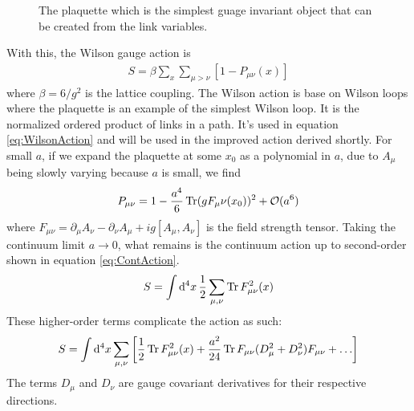 \documentclass[11pt]{article}
\begin{document}
\begin{figure}[h]
\centering
{}
\caption{The plaquette which is the simplest guage invariant object that can be created from the link variables.} \label{fig:Plaq}
\end{figure}
With this, the Wilson gauge action is
\begin{align}
	S=\beta\sum_x\sum_{\mu>\nu}[1-P_{\mu\nu}(x)]
	\label{eq:WilsonAction}
\end{align}
where $\beta=6/g^2$ is the lattice coupling. The Wilson action is base on Wilson loops where the plaquette is an example of the simplest Wilson loop. It is the normalized ordered product of links in a path. It's used in equation \ref{eq:WilsonAction} and will be used in the improved action derived shortly. For small $a$, if we expand the plaquette at some $x_0$ as a polynomial in $a$, due to $A_\mu$ being slowly varying because $a$ is small, we find
\begin{align}
	P_{\mu\nu}=1-\frac{a^4}{6}\Trace(gF_\mu\nu(x_0))^2+\mathcal{O}(a^6)
\end{align}
where $F_{\mu\nu}=\partial_\mu A_\nu-\partial_\nu A_\mu+ig[A_\mu,A_\nu]$ is the field strength tensor. Taking the continuum limit $a\to0$, what remains is the continuum action up to second-order shown in equation \ref{eq:ContAction}.
\begin{align}
	S=\int\dd[4]{x}\frac{1}{2}\sum_{\mu,\nu}\Trace F_{\mu\nu}^2(x)
	\label{eq:ContAction}
\end{align}
These higher-order terms complicate the action as such:
\begin{align}
	S=\int\dd[4]{x}\sum_{\mu,\nu}\left[\frac{1}{2}\Trace F_{\mu\nu}^2(x)+\frac{a^2}{24}\Trace F_{\mu\nu}(D_\mu^2+D_\nu^2)F_{\mu\nu}+\ldots\right]
\end{align}
The terms $D_\mu$ and $D_\nu$ are gauge covariant derivatives for their respective directions.
\end{document}

